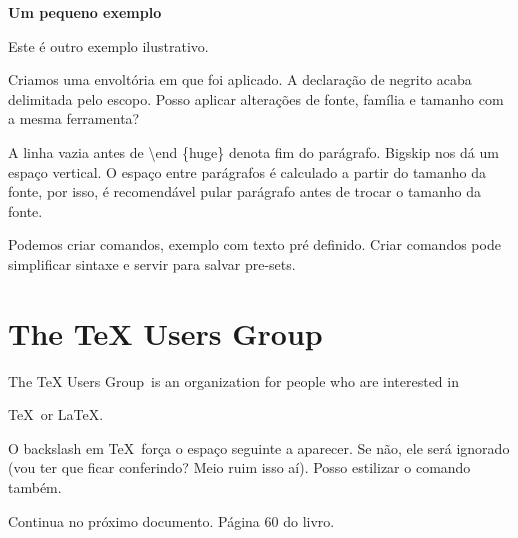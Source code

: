 \documentclass[a4paper, 12pt]{article}
\begin{document}
\begin{huge}
    \bfseries
    Um pequeno exemplo

\end{huge}

\bigskip

Este é outro exemplo ilustrativo.


Criamos uma envoltória em que \huge foi aplicado.
A declaração de negrito acaba delimitada pelo escopo.
Posso aplicar alterações de fonte, família e tamanho com a mesma ferramenta?

A linha vazia antes de \textbackslash end \{huge\} denota fim do parágrafo.
Bigskip nos dá um espaço vertical.
O espaço entre parágrafos é calculado a partir do tamanho 
da fonte, por isso, é recomendável pular parágrafo antes
de trocar o tamanho da fonte.

Podemos criar comandos, exemplo com texto pré definido.
Criar comandos pode simplificar sintaxe e servir para salvar
pre-sets.

\newcommand{\TUG}{TeX Users Group}

\section{The \TUG}

The \TUG\ is an organization for people who are interested in 

\TeX\ or \LaTeX.

\newcommand{\TUG}{\textsc{TeX Users Group}}

O backslash em \TeX\ força o espaço seguinte a aparecer.
Se não, ele será ignorado
(vou ter que ficar conferindo? Meio ruim isso aí).
Posso estilizar o comando também.

Continua no próximo documento. Página 60 do livro.
\end{document}

